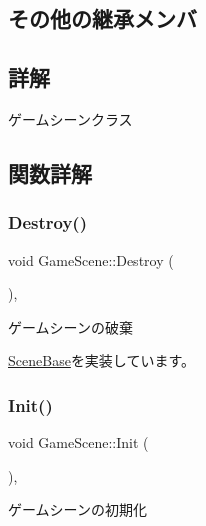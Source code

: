 \subsection*{その他の継承メンバ}


\subsection{詳解}
ゲームシーンクラス 

\subsection{関数詳解}
\mbox{\label{class_game_scene_a5c544d5a87a60f09ada75f1f60f0a787}} 
\subsubsection{\texorpdfstring{Destroy()}{Destroy()}}
{\footnotesize\ttfamily void Game\+Scene\+::\+Destroy (\begin{DoxyParamCaption}{ }\end{DoxyParamCaption})\hspace{0.3cm}{\ttfamily [final]}, {\ttfamily [virtual]}}



ゲームシーンの破棄 



\mbox{\hyperlink{class_scene_base_a7c5b54020bc519b4dadfe9770d6b27f7}{Scene\+Base}}を実装しています。

\mbox{\label{class_game_scene_a86227765def624b9b227db2aa41d9141}} 
\subsubsection{\texorpdfstring{Init()}{Init()}}
{\footnotesize\ttfamily void Game\+Scene\+::\+Init (\begin{DoxyParamCaption}{ }\end{DoxyParamCaption})\hspace{0.3cm}{\ttfamily [final]}, {\ttfamily [virtual]}}



ゲームシーンの初期化 



